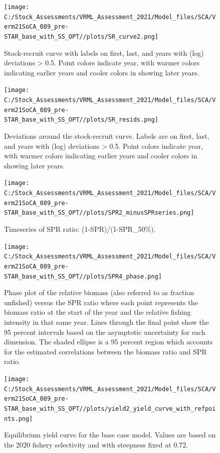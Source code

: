 \documentclass[
  english,
  a4paper,
]{article}
\begin{document}
\begin{figure}
\centering
\texttt{[image: C:/Stock\_Assessments/VRML\_Assessment\_2021/Model\_files/SCA/Verm21SoCA\_089\_pre-STAR\_base\_with\_SS\_OPT//plots/SR\_curve2.png]}
\caption{Stock-recruit curve with labels on first, last, and years with (log) deviations \textgreater{} 0.5. Point colors indicate year, with warmer colors indicating earlier years and cooler colors in showing later years.\label{fig:bh-curve}}
\end{figure}

\begin{figure}
\centering
\texttt{[image: C:/Stock\_Assessments/VRML\_Assessment\_2021/Model\_files/SCA/Verm21SoCA\_089\_pre-STAR\_base\_with\_SS\_OPT//plots/SR\_resids.png]}
\caption{Deviations around the stock-recruit curve. Labels are on first, last, and years with (log) deviations \textgreater{} 0.5. Point colors indicate year, with warmer colors indicating earlier years and cooler colors in showing later years.\label{fig:bh-resids}}
\end{figure}

\begin{figure}
\centering
\texttt{[image: C:/Stock\_Assessments/VRML\_Assessment\_2021/Model\_files/SCA/Verm21SoCA\_089\_pre-STAR\_base\_with\_SS\_OPT//plots/SPR2\_minusSPRseries.png]}
\caption{Timeseries of SPR ratio: (1-SPR)/(1-SPR\_50\%).\label{fig:1-spr}}
\end{figure}

\begin{figure}
\centering
\texttt{[image: C:/Stock\_Assessments/VRML\_Assessment\_2021/Model\_files/SCA/Verm21SoCA\_089\_pre-STAR\_base\_with\_SS\_OPT//plots/SPR4\_phase.png]}
\caption{Phase plot of the relative biomass (also referred to as fraction unfished) versus the SPR ratio where each point represents the biomass ratio at the start of the year and the relative fishing intensity in that same year. Lines through the final point show the 95 percent intervals based on the asymptotic uncertainty for each dimension. The shaded ellipse is a 95 percent region which accounts for the estimated correlations between the biomass ratio and SPR ratio.\label{fig:phase}}
\end{figure}

\begin{figure}
\centering
\texttt{[image: C:/Stock\_Assessments/VRML\_Assessment\_2021/Model\_files/SCA/Verm21SoCA\_089\_pre-STAR\_base\_with\_SS\_OPT//plots/yield2\_yield\_curve\_with\_refpoints.png]}
\caption{Equilibrium yield curve for the base case model. Values are based on the 2020
fishery selectivity and with steepness fixed at 0.72.\label{fig:yield2}}
\end{figure}
\end{document}
